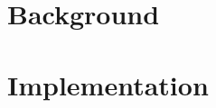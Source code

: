 \documentclass[12pt, oneside]{book}
\begin{document}

\newpage 

\tableofcontents
\lstlistoflistings
\listoffigures



\newpage 



\mainmatter


 

\part{Background}



\part{Implementation}


 





\newpage	

\backmatter

\thispagestyle{empty}
\nocite{*}
\clearpage


 


 








%
%
%
%
\end{document}
